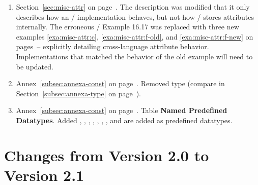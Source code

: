 \begin{enumerate}
{}
\item
Section~\ref{sec:misc-attr} on page~\pageref{sec:misc-attr}. %
\newline
The description was modified that it only describes how an \MPI/ implementation behaves, but not how \MPI/ stores attributes internally. The erroneous \MPIIIDOTI/ Example 16.17 was replaced with three new examples \ref{exa:misc-attr:c}, \ref{exa:misc-attr:f-old}, and \ref{exa:misc-attr:f-new} on pages~\pageref{exa:misc-attr:c:pagebegin}--\pageref{exa:misc-attr:f-new:pagebegin} explicitly detailing cross-language attribute behavior. Implementations that matched the behavior of the old example will need to be updated.  

\item
Annex~\ref{subsec:annexa-const} on page~\pageref{subsec:annexa-const}. %
\newline
Removed type  (compare  in 
Section~\ref{subsec:annexa-type} on page~\pageref{subsec:annexa-type}). %

\item
{}%
%
Annex~\ref{subsec:annexa-const} on page~\pageref{subsec:annexa-const}. %
Table \textbf{Named Predefined Datatypes}. %
\newline
Added , , , , , , , and  are added as predefined datatypes.

  
\end{enumerate}

\section{Changes from Version 2.0 to Version 2.1} 
\label{sec:changes:last}
 

